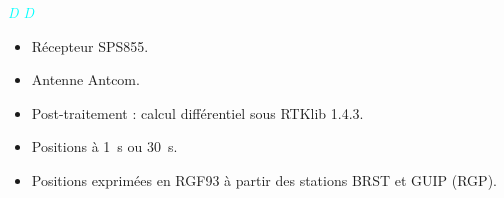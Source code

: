 \documentclass[portrait,final,a0paper,fontscale=0.3]{baposter}
\begin{document}
\begin{poster}
{\begin{minipage}[t]{0.24\textwidth}
\begin{itemize}
		\end{itemize}
	\end{minipage}
	\begin{minipage}[t]{0.24\textwidth}
		\vspace{-0.1cm}
		\begin{center}
			\large\textcolor{cyan}{\emph{D D}}
		\end{center}
		\small\vspace{-0.4cm}
		\begin{itemize}
			\item Récepteur SPS855.
			\item Antenne Antcom.
			\item Post-traitement : calcul différentiel sous RTKlib 1.4.3.
			\item Positions à 1~s ou 30~s.
			\item Positions exprimées en RGF93 à partir des stations BRST et GUIP (RGP).
		\end{itemize}
	\end{minipage}
}

\end{poster}
\end{document}
